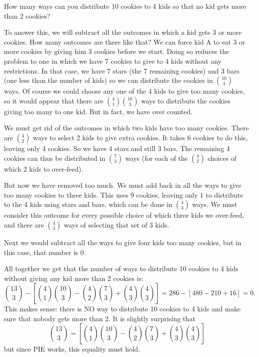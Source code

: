 \documentclass[12pt]{article}
\begin{document}
\begin{example}
How many ways can you distribute 10 cookies to 4 kids so that no kid gets more than 2 cookies?

\begin{solution}
To answer this, we will subtract all the outcomes in which a kid gets 3 or more cookies.  How many outcomes are there like that?  We can force kid A to eat 3 or more cookies by giving him 3 cookies before we start.  Doing so reduces the problem to one in which we have 7 cookies to give to 4 kids without any restrictions.  In that case, we have 7 stars (the 7 remaining cookies) and 3 bars (one less than the number of kids) so we can distribute the cookies in ${10 \choose 3}$ ways.  Of course we could choose any one of the 4 kids to give too many cookies, so it would appear that there are ${4 \choose 1}{10 \choose 3}$ ways to distribute the cookies giving too many to one kid.  But in fact, we have over counted.

We must get rid of the outcomes in which two kids have too many cookies.  There are ${4 \choose 2}$ ways to select 2 kids to give extra cookies.  It takes 6 cookies to do this, leaving only 4 cookies.  So we have 4 stars and still 3 bars.  The remaining 4 cookies can thus be distributed in ${7 \choose 3}$ ways (for each of the ${4 \choose 2}$ choices of which 2 kids to over-feed).

But now we have removed too much.  We must add back in all the ways to give too many cookies to three kids.  This uses 9 cookies, leaving only 1 to distribute to the 4 kids using stars and bars, which can be done in ${4 \choose 3}$ ways.  We must consider this outcome for every possible choice of which three kids we over-feed, and there are ${4 \choose 3}$ ways of selecting that set of 3 kids.

Next we would subtract all the ways to give four kids too many cookies, but in this case, that number is 0.

All together we get that the number of ways to distribute 10 cookies to 4 kids without giving any kid more than 2 cookies is:
\[{13 \choose 3} - \left[{4 \choose 1}{10 \choose 3} - {4 \choose 2}{7 \choose 3} + {4\choose 3}{4\choose 3}\right] = 286 - [480 - 210 + 16] = 0.\]
This makes sense: there is NO way to distribute 10 cookies to 4 kids and make sure that nobody gets more than 2.  It is slightly surprising that \[{13 \choose 3} = \left[{4 \choose 1}{10 \choose 3} - {4 \choose 2}{7 \choose 3} + {4\choose 3}{4\choose 3}\right]\] but since PIE works, this equality must hold.
\end{solution}
\end{example}
\end{document}
